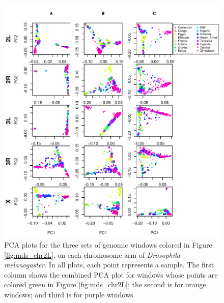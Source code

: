 \documentclass[11pt, oneside]{article}   	%
\begin{document}
\begin{figure}
    \begin{center}
       \includegraphics[width=1\textwidth]{Fig2_pca_plots_allchr_3peaks_label_update}
    \end{center}
    \caption{      
        PCA plots for the three sets of genomic windows colored in Figure \ref{fig:mds_chr2L},
        on each chromosome arm of \textit{Drosophila melanogaster}.
        In all plots, each point represents a sample. 
        The first column shows the combined PCA plot for windows 
        whose points are colored green in Figure \ref{fig:mds_chr2L}; 
        the second is for orange windows; 
        and third is for purple windows.
         \label{fig:pca_by_pop}
    }
\end{figure}
\end{document}
